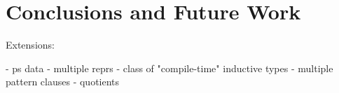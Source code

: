 \section{Conclusions and Future Work}\label{sec:conclusion}

Extensions:

- ps data
- multiple reprs
- class of "compile-time" inductive types
- multiple pattern clauses
- quotients
